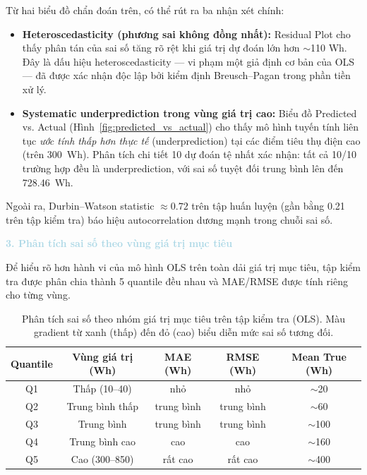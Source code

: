 Từ hai biểu đồ chẩn đoán trên, có thể rút ra ba nhận xét chính:

\begin{itemize}[labelsep=10pt, leftmargin=2cm]
    \item \textbf{Heteroscedasticity (phương sai không đồng nhất):}
          Residual Plot cho thấy phân tán của sai số tăng rõ rệt khi giá trị dự đoán
          lớn hơn $\sim$110 Wh. Đây là dấu hiệu heteroscedasticity --- vi phạm một
          giả định cơ bản của OLS --- đã được xác nhận độc lập bởi kiểm định
          Breusch--Pagan trong phần tiền xử lý.

    \item \textbf{Systematic underprediction trong vùng giá trị cao:}
          Biểu đồ Predicted vs. Actual (Hình~\ref{fig:predicted_vs_actual}) cho thấy
          mô hình tuyến tính liên tục \textit{ước tính thấp hơn thực tế} (underprediction)
          tại các điểm tiêu thụ điện cao (trên 300~Wh). Phân tích chi tiết 10 dự đoán
          tệ nhất xác nhận: tất cả 10/10 trường hợp đều là underprediction, với sai số
          tuyệt đối trung bình lên đến 728.46~Wh.
\end{itemize}

Ngoài ra, Durbin--Watson statistic $\approx 0.72$ trên tập huấn luyện (gần bằng 0.21
trên tập kiểm tra) báo hiệu autocorrelation dương mạnh trong chuỗi sai số.

\noindent\textcolor{lightblue}{\textbf{3. Phân tích sai số theo vùng giá trị mục tiêu}}

Để hiểu rõ hơn hành vi của mô hình OLS trên toàn dải giá trị mục tiêu, tập kiểm tra
được phân chia thành 5 quantile đều nhau và MAE/RMSE được tính riêng cho từng vùng.

\begin{table}[H]
\centering
\caption{Phân tích sai số theo nhóm giá trị mục tiêu trên tập kiểm tra (OLS).
         Màu gradient từ xanh (thấp) đến đỏ (cao) biểu diễn mức sai số tương đối.}
\label{tab:error_by_range}
\renewcommand{\arraystretch}{1.3}
\begin{tabular}{|c|c|c|c|c|}
    \hline
    \textbf{Quantile} & \textbf{Vùng giá trị (Wh)} & \textbf{MAE (Wh)} & \textbf{RMSE (Wh)} & \textbf{Mean True (Wh)} \\
    \hline
    Q1 & Thấp (10--40)   & nhỏ  & nhỏ  & $\sim$20  \\
    Q2 & Trung bình thấp  & trung bình & trung bình & $\sim$60 \\
    Q3 & Trung bình       & trung bình   & trung bình   & $\sim$100 \\
    Q4 & Trung bình cao   & cao   & cao   & $\sim$160 \\
    Q5 & Cao (300--850)  & rất cao & rất cao & $\sim$400 \\
    \hline
\end{tabular}
\end{table}


